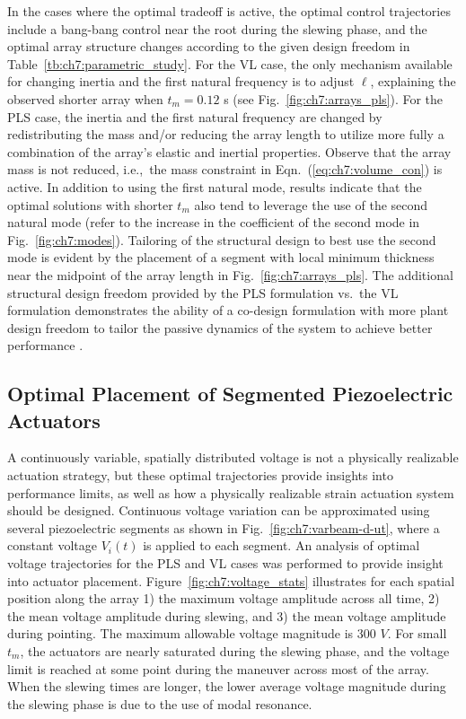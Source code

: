 In the cases where the optimal tradeoff is active, the optimal control trajectories include a bang-bang control near the root during the slewing phase, and the optimal array structure changes according to the given design freedom in Table~\ref{tb:ch7:parametric_study}. For the VL case, the only mechanism available for changing inertia and the first natural frequency is to adjust $\ell$, explaining the observed shorter array when $t_m = 0.12$ s (see Fig.~\ref{fig:ch7:arrays_pls}). For the PLS case, the inertia and the first natural frequency are changed by redistributing the mass and/or reducing the array length to utilize more fully a combination of the array's elastic and inertial properties. Observe that the array mass is not reduced, i.e.,~the mass constraint in Eqn.~(\ref{eq:ch7:volume_con}) is active. In addition to using the first natural mode, results indicate that the optimal solutions with shorter $t_m$ also tend to leverage the use of the second natural mode (refer to the increase in the coefficient of the second mode in Fig.~\ref{fig:ch7:modes}). Tailoring of the structural design to best use the second mode is evident by the placement of a segment with local minimum thickness near the midpoint of the array length in Fig.~\ref{fig:ch7:arrays_pls}. The additional structural design freedom provided by the PLS formulation vs.~the VL formulation demonstrates the ability of a co-design formulation with more plant design freedom to tailor the passive dynamics of the system to achieve better performance \cite{Allison2013d}.







\subsection{Optimal Placement of Segmented Piezoelectric Actuators \label{sec:ch7:placement}}

A continuously variable, spatially distributed voltage is not a physically realizable actuation strategy, but these optimal trajectories provide insights into performance limits, as well as how a physically realizable strain actuation system should be designed. Continuous voltage variation can be approximated using several piezoelectric segments as shown in Fig.~\ref{fig:ch7:varbeam-d-ut}, where a constant voltage $V_i(t)$ is applied to each segment. An analysis of optimal voltage trajectories for the PLS and VL cases was performed to provide insight into actuator placement. Figure~\ref{fig:ch7:voltage_stats} illustrates for each spatial position along the array 1) the maximum voltage amplitude across all time, 2) the mean voltage amplitude during slewing, and 3) the mean voltage amplitude during pointing. The maximum allowable voltage magnitude is 300 $V$. For small $t_m$, the actuators are nearly saturated during the slewing phase, and the voltage limit is reached at some point during the maneuver across most of the array. When the slewing times are longer, the lower average voltage magnitude during the slewing phase is due to the use of modal resonance.

